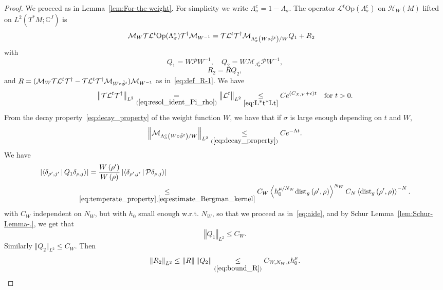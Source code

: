 \documentclass[10pt]{amsart}
\theoremstyle{definition}\newtheorem{defi}[theo]{Definition}\newtheorem{rema}[theo]{Remark}\newtheorem{exam}[theo]{Example}\newtheorem{exem}[theo]{Example}\newtheorem{nota}[theo]{Notation}
\newcommand*\eq[1]{\underset{(#1)}{=}}
\newcommand*\ineq[1]{\underset{(#1)}{\leq}}
\newcommand{\clT}{\mathcal{T}}
\newcommand{\clH}{\mathcal{H}}
\newcommand{\clL}{\mathcal{L}}
\newcommand{\clM}{\mathcal{M}}
\newcommand{\clP}{\mathcal{P}}
\newcommand{\dist}{\mathrm{dist}}
\newcommand{\bbC}{\mathbb{C}}
\let\oldtilde\tilde
\renewcommand*{\tilde}[1]{\mathchoice{\widetilde{#1}}{\widetilde{#1}}{\oldtilde{#1}}{\oldtilde{#1}}}
\begin{document}
\begin{proof}
We proceed as in Lemma~\ref{lem:For-the-weight}. For simplicity we write $\Lambda_{\sigma}^{c}=1-\Lambda_{\sigma}$. The operator $\ensuremath{\clL^{t}}\textrm{Op}(\Lambda_{\sigma}^{c})$ on $\clH _{W}(M)$ lifted on $L^{2}(T^{*}M;\bbC^{J})$ is
\begin{align*}
\clM_{W}\text{\ensuremath{\clT}\ensuremath{\clL^{t}}\textrm{Op}\ensuremath{\left(\Lambda_{\sigma}^{c}\right)}\ensuremath{\ensuremath{\clT^{\dagger}}}}\clM_{W^{-1}} & =\ensuremath{\clT}\ensuremath{\clL^{t}}\ensuremath{\clT^{\dagger}}\clM_{\Lambda_{\sigma}^{c}\left(W\circ\tilde{\phi}^{t}\right)/W}Q_{1}+R_{2}
\end{align*}
with
\[
Q_{1}=W\clP W^{-1},\quad Q_{2}=W\clM_{\Lambda_{\sigma}^{c}}\clP W^{-1},
\]
\[
R_{2}=RQ_{2},
\]
and $R=(\clM_{W}\text{\ensuremath{\clT}\ensuremath{\clL^{t}}\ensuremath{\clT^{\dagger}}}-\text{\ensuremath{\clT}\ensuremath{\clL^{t}}\ensuremath{\clT^{\dagger}}}\clM_{W\circ\tilde{\phi}^{t}})\clM_{W^{-1}}$ as in~\eqref{eq:def_R-1}. We have
\[
\left\Vert \ensuremath{\clT}\ensuremath{\clL^{t}}\ensuremath{\clT^{\dagger}}\right\Vert _{L^{2}}\eq{\ref{eq:resol_ident_Pi_rho}}\ensuremath{\left\Vert \clL^{t}\right\Vert _{L^{2}}}\underset{\eqref{eq:L*t*Lt}}{\leq}Ce^{\left(C_{X,V}+\epsilon\right)t}\quad\text{for }t>0.
\]
From the decay property~\eqref{eq:decay_property} of the weight function $W$, we have that if $\sigma$ is large enough depending on $t$ and $W$,
\[
\left\Vert \clM_{\Lambda_{\sigma}^{c}\left(W\circ\tilde{\phi}^{t}\right)/W}\right\Vert _{L^{2}}\ineq{\ref{eq:decay_property}}Ce^{-\Lambda t}.
\]
We have
\begin{align*}
\left|\left\langle\delta_{\rho',j'}\,\middle|\,Q_{1}\delta_{\rho,j}\right\rangle\right| & =\frac{W\left(\rho'\right)}{W\left(\rho\right)}\left|\langle\delta_{\rho',j'}\,\middle|\,\clP \delta_{\rho,j}\rangle\right|\\
& \mkern-29mu\underset{\eqref{eq:temperate_property},\eqref{eq:estimate_Bergman_kernel}}{\leq}C_{W}\left\langle h_{0}^{\mu/N_{W}}\dist_{g}\left(\rho',\rho\right)\right\rangle ^{N_{W}}C_{N}\left\langle \dist_{g}\left(\rho',\rho\right)\right\rangle ^{-N}.
\end{align*}
with $C_{W}$ independent on $N_{W}$, but with $h_{0}$ small enough w.r.t. $N_{W}$, so that we proceed as in~\eqref{eq:aide}, and by Schur Lemma~\ref{lem:Schur-Lemma-.}, we get that
\[
\left\Vert Q_{1}\right\Vert _{L^{2}}\le C_{W}.
\]
Similarly $\Vert Q_{2}\Vert _{L^{2}}\le C_{W}$. Then
\[
\left\Vert R_{2}\right\Vert _{L^{2}}\le\left\Vert R\right\Vert \left\Vert Q_{2}\right\Vert \ineq{\ref{eq:bound_R}}C_{W,N_{W},t}h_{0}^{\mu}.
\]
\end{proof}
\end{document}
